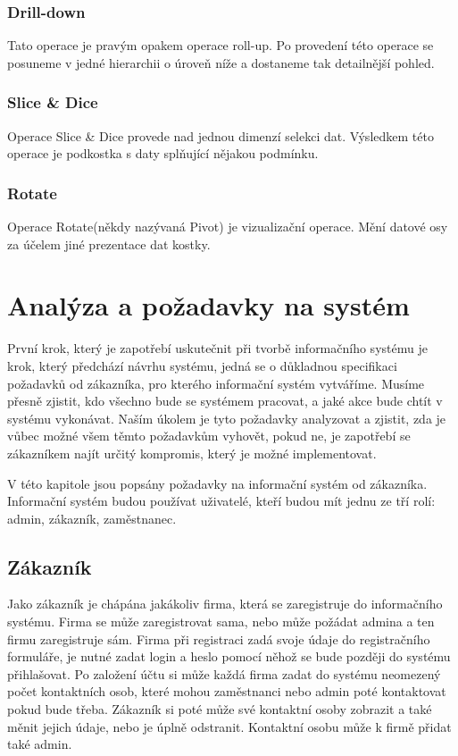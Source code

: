 \subsection*{Drill-down}

Tato operace je pravým opakem operace roll-up. Po provedení této operace se posuneme v jedné hierarchii o úroveň níže a dostaneme tak detailnější pohled. 

\subsection*{Slice \& Dice}

Operace Slice \& Dice provede nad jednou dimenzí selekci dat. Výsledkem této operace je podkostka s daty splňující nějakou podmínku.

\subsection*{Rotate}

Operace Rotate(někdy nazývaná Pivot) je vizualizační operace. Mění datové osy za účelem jiné prezentace dat kostky.




\chapter{Analýza a požadavky na systém}
\label{analysis}

První krok, který je zapotřebí uskutečnit při tvorbě informačního systému je krok, který předchází návrhu systému, jedná se o důkladnou specifikaci požadavků od zákazníka, pro kterého informační systém vytváříme. Musíme přesně zjistit, kdo všechno bude se systémem pracovat, a jaké akce bude chtít v systému vykonávat. Naším úkolem je tyto požadavky analyzovat a zjistit, zda je vůbec možné všem těmto požadavkům vyhovět, pokud ne, je zapotřebí se zákazníkem najít určitý kompromis, který je možné implementovat.

V této kapitole jsou popsány požadavky na informační systém od zákazníka. Informační systém budou používat uživatelé, kteří budou mít jednu ze tří rolí: admin, zákazník, zaměstnanec.

\section{Zákazník}

Jako zákazník je chápána jakákoliv firma, která se zaregistruje do informačního systému. Firma se může zaregistrovat sama, nebo může požádat admina a ten firmu zaregistruje sám. Firma při registraci zadá svoje údaje do registračního formuláře, je nutné zadat login a heslo pomocí něhož se bude později do systému přihlašovat. Po založení účtu si může každá firma zadat do systému neomezený počet kontaktních osob, které mohou zaměstnanci nebo admin poté kontaktovat pokud bude třeba. Zákazník si poté může své kontaktní osoby zobrazit a také měnit jejich údaje, nebo je úplně odstranit. Kontaktní osobu může k firmě přidat také admin.

